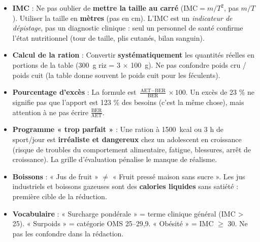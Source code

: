 \documentclass[11pt]{article}
\begin{document}
\begin{attention}
\begin{itemize}
\item \textbf{IMC} : Ne pas oublier de \textbf{mettre la taille au carré} ($\mathrm{IMC} = m/T^2$, pas $m/T$). Utiliser la taille en \textbf{mètres} (pas en cm). L'IMC est un \emph{indicateur de dépistage}, pas un diagnostic clinique : seul un personnel de santé confirme l'état nutritionnel (tour de taille, plis cutanés, bilan sanguin).
\item \textbf{Calcul de la ration} : Convertir \textbf{systématiquement} les quantités réelles en portions de la table (\SI{300}{g} riz = 3 $\times$ \SI{100}{g}). Ne pas confondre poids cru / poids cuit (la table donne souvent le poids cuit pour les féculents).
\item \textbf{Pourcentage d'excès} : La formule est $\frac{\text{AET} - \text{BER}}{\text{BER}} \times 100$. Un excès de 23 \% ne signifie pas que l'apport est 123 \% des besoins (c'est la même chose), mais attention à ne pas écrire $\frac{\text{BER}}{\text{AET}}$.
\item \textbf{Programme « trop parfait »} : Une ration à \SI{1500}{kcal} ou 3 h de sport/jour est \textbf{irréaliste et dangereux} chez un adolescent en croissance (risque de troubles du comportement alimentaire, fatigue, blessures, arrêt de croissance). La grille d'évaluation pénalise le manque de réalisme.
\item \textbf{Boissons} : « Jus de fruit » $\neq$ « Fruit pressé maison sans sucre ». Les jus industriels et boissons gazeuses sont des \textbf{calories liquides} sans satiété : première cible de la réduction.
\item \textbf{Vocabulaire} : « Surcharge pondérale » = terme clinique général (IMC > 25). « Surpoids » = catégorie OMS 25--29,9. « Obésité » = IMC $\geq$ 30. Ne pas les confondre dans la rédaction.
\end{itemize}
\end{attention}
\end{document}
